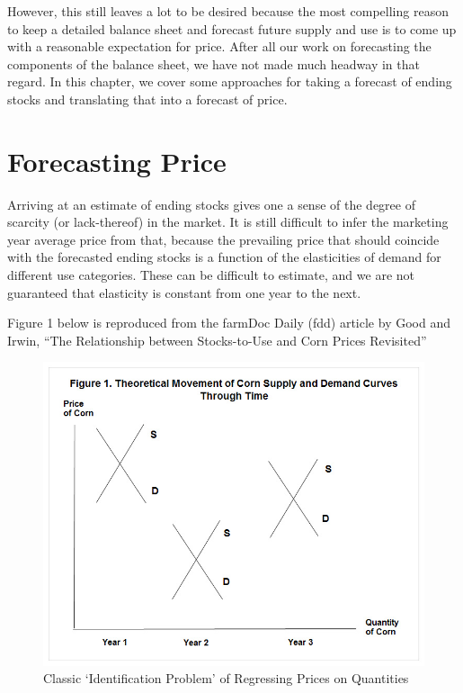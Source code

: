 \documentclass[
  letterpaper,
  DIV=11,
  numbers=noendperiod]{scrreprt}
\begin{document}
However, this still leaves a lot to be desired because the most
compelling reason to keep a detailed balance sheet and forecast future
supply and use is to come up with a reasonable expectation for price.
After all our work on forecasting the components of the balance sheet,
we have not made much headway in that regard. In this chapter, we cover
some approaches for taking a forecast of ending stocks and translating
that into a forecast of price.

\hypertarget{forecasting-price}{%
\section{Forecasting Price}\label{forecasting-price}}

Arriving at an estimate of ending stocks gives one a sense of the degree
of scarcity (or lack-thereof) in the market. It is still difficult to
infer the marketing year average price from that, because the prevailing
price that should coincide with the forecasted ending stocks is a
function of the elasticities of demand for different use categories.
These can be difficult to estimate, and we are not guaranteed that
elasticity is constant from one year to the next.

Figure 1 below is reproduced from the farmDoc Daily (fdd) article by
Good and Irwin, ``The Relationship between Stocks-to-Use and Corn Prices
Revisited''

\begin{figure}

{\centering \includegraphics{images/fdd04092015_fig1.jpg}

}

\caption{Classic `Identification Problem' of Regressing Prices on
Quantities}

\end{figure}
\end{document}

